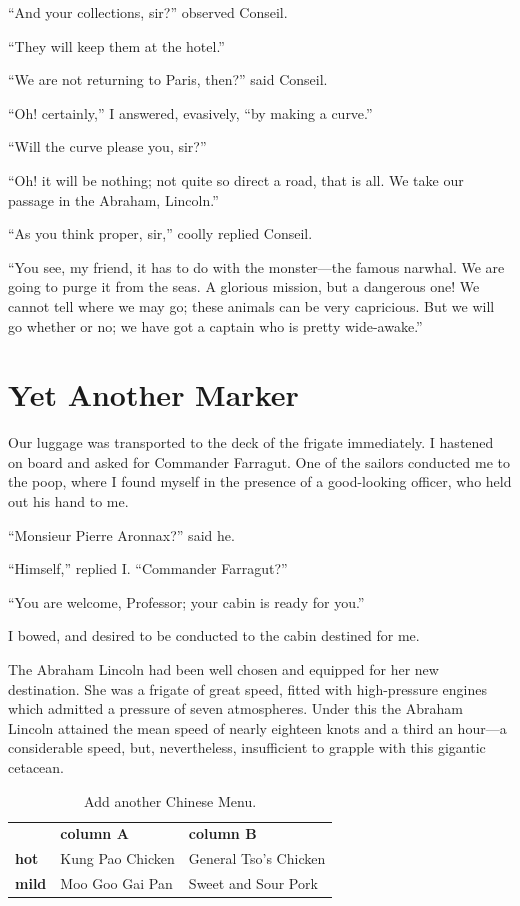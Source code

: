 ``And your collections, sir?'' observed Conseil.

``They will keep them at the hotel.''

``We are not returning to Paris, then?'' said Conseil.

``Oh! certainly,'' I answered, evasively, ``by making a curve.''

``Will the curve please you, sir?''

``Oh! it will be nothing; not quite so direct a road, that is all.
We take our passage in the Abraham, Lincoln.''

``As you think proper, sir,'' coolly replied Conseil.

``You see, my friend, it has to do with the monster---the
famous narwhal.  We are going to purge it from the seas.
A glorious mission, but a dangerous one!  We cannot tell
where we may go; these animals can be very capricious.
But we will go whether or no; we have got a captain who
is pretty wide-awake.''

\section{Yet Another Marker}

Our luggage was transported to the deck of the frigate immediately.
I hastened on board and asked for Commander Farragut.
One of the sailors conducted me to the poop, where I found myself
in the presence of a good-looking officer, who held out his
hand to me.

``Monsieur Pierre Aronnax?'' said he.

``Himself,'' replied I. ``Commander Farragut?''

``You are welcome, Professor; your cabin is ready for you.''

I bowed, and desired to be conducted to the cabin destined for me.

The Abraham Lincoln had been well chosen and equipped
for her new destination.  She was a frigate of great speed,
fitted with high-pressure engines which admitted a pressure
of seven atmospheres.  Under this the Abraham Lincoln attained
the mean speed of nearly eighteen knots and a third an hour---a
considerable speed, but, nevertheless, insufficient to grapple
with this gigantic cetacean.

\vskip 0.25in
\begin{table}%
 \caption[Add another table]{Add another Chinese Menu.}
 \begin{center}
  \begin{tabular}{lp{4.4cm}p{4.4cm}}
                & \textbf{column A} & \textbf{column B} \\
  \textbf{hot}  & Kung Pao Chicken  & General Tso's Chicken \\
  \textbf{mild} & Moo Goo Gai Pan   & Sweet and Sour Pork
  \end{tabular}
  \label{tab:test2}
 \end{center}
\end{table}

